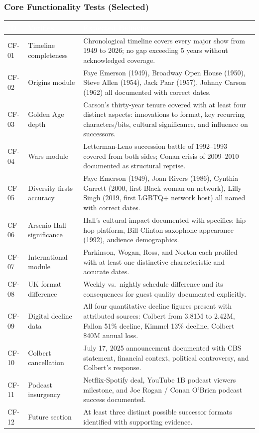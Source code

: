\documentclass[11pt,letterpaper]{article}
\newcommand{\tableheader}[1]{\textbf{\sffamily\textcolor{white}{#1}}}
\begin{document}
\subsubsection{Core Functionality Tests (Selected)}

\begin{center}
\begin{tabularx}{\textwidth}{C{1.2cm}L{3cm}X}
\toprule
{}
\tableheader{ID} & \tableheader{Verifies} & \tableheader{Expected Behavior} \\
\midrule
CF-01 & Timeline completeness & Chronological timeline covers every major show from 1949 to 2026; no gap exceeding 5 years without acknowledged coverage. \\
CF-02 & Origins module & Faye Emerson (1949), Broadway Open House (1950), Steve Allen (1954), Jack Paar (1957), Johnny Carson (1962) all documented with correct dates. \\
CF-03 & Golden Age depth & Carson's thirty-year tenure covered with at least four distinct aspects: innovations to format, key recurring characters/bits, cultural significance, and influence on successors. \\
CF-04 & Wars module & Letterman-Leno succession battle of 1992--1993 covered from both sides; Conan crisis of 2009--2010 documented as structural reprise. \\
CF-05 & Diversity firsts accuracy & Faye Emerson (1949), Joan Rivers (1986), Cynthia Garrett (2000, first Black woman on network), Lilly Singh (2019, first LGBTQ+ network host) all named with correct dates. \\
CF-06 & Arsenio Hall significance & Hall's cultural impact documented with specifics: hip-hop platform, Bill Clinton saxophone appearance (1992), audience demographics. \\
CF-07 & International module & Parkinson, Wogan, Ross, and Norton each profiled with at least one distinctive characteristic and accurate dates. \\
CF-08 & UK format difference & Weekly vs.\ nightly schedule difference and its consequences for guest quality documented explicitly. \\
CF-09 & Digital decline data & All four quantitative decline figures present with attributed sources: Colbert from 3.81M to 2.42M, Fallon 51\% decline, Kimmel 13\% decline, Colbert \$40M annual loss. \\
CF-10 & Colbert cancellation & July 17, 2025 announcement documented with CBS statement, financial context, political controversy, and Colbert's response. \\
CF-11 & Podcast insurgency & Netflix-Spotify deal, YouTube 1B podcast viewers milestone, and Joe Rogan / Conan O'Brien podcast success documented. \\
CF-12 & Future section & At least three distinct possible successor formats identified with supporting evidence. \\
\bottomrule
\end{tabularx}
\end{center}
\end{document}
